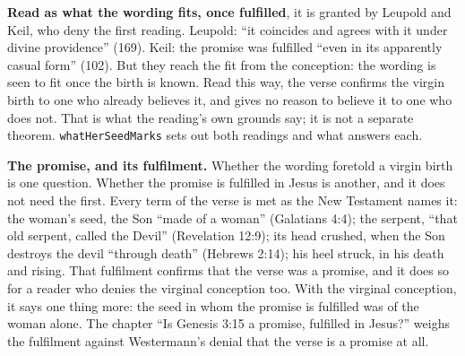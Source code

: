 \documentclass[11pt]{article}
\begin{document}
\textbf{Read as what the wording fits, once fulfilled}, it is granted by Leupold and Keil, who deny the first reading. Leupold: “it coincides and agrees with it under divine providence” (169). Keil: the promise was fulfilled “even in its apparently casual form” (102). But they reach the fit from the conception: the wording is seen to fit once the birth is known. Read this way, the verse confirms the virgin birth to one who already believes it, and gives no reason to believe it to one who does not. That is what the reading’s own grounds say; it is not a separate theorem. \texttt{what\allowbreak{}Her\allowbreak{}Seed\allowbreak{}Marks} sets out both readings and what answers each.

\textbf{The promise, and its fulfilment.} Whether the wording foretold a virgin birth is one question. Whether the promise is fulfilled in Jesus is another, and it does not need the first. Every term of the verse is met as the New Testament names it: the woman’s seed, the Son “made of a woman” (Galatians 4:4); the serpent, “that old serpent, called the Devil” (Revelation 12:9); its head crushed, when the Son destroys the devil “through death” (Hebrews 2:14); his heel struck, in his death and rising. That fulfilment confirms that the verse was a promise, and it does so for a reader who denies the virginal conception too. With the virginal conception, it says one thing more: the seed in whom the promise is fulfilled was of the woman alone. The chapter “Is Genesis 3:15 a promise, fulfilled in Jesus?” weighs the fulfilment against Westermann’s denial that the verse is a promise at all.
\end{document}
